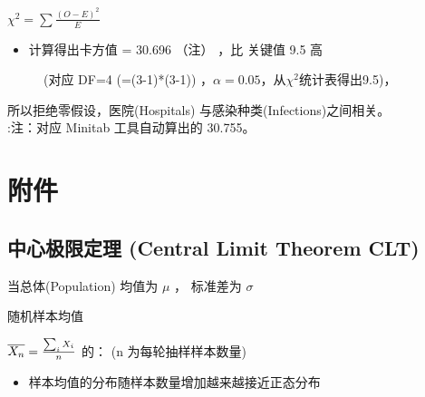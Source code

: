 \(\chi ^2 = \sum \frac{(O - E)^2} {E}\)

\begin{itemize}
\tightlist
\item
  计算得出卡方值 = 30.696 （注） ，比 关键值 9.5 高
\end{itemize}

\begin{description}
\item[]
(对应 DF=4 (=(3-1)*(3-1))
，\(\alpha = 0.05\)，从\(\chi ^2\)统计表得出9.5)，\\
\end{description}

所以拒绝零假设，医院(Hospitals) 与感染种类(Infections)之间相关。\\
:注：对应 Minitab 工具自动算出的 30.755。

\hypertarget{ux9644ux4ef6}{%
\section{附件}\label{ux9644ux4ef6}}

\hypertarget{ux4e2dux5fc3ux6781ux9650ux5b9aux7406-central-limit-theorem-clt}{%
\subsection{中心极限定理 (Central Limit Theorem
CLT)}\label{ux4e2dux5fc3ux6781ux9650ux5b9aux7406-central-limit-theorem-clt}}

当总体(Population) 均值为 \(\mu\) ， 标准差为 \(\sigma\)

\begin{description}
\tightlist
\item[]
随机样本均值
\end{description}

\(\overline{X_n} = {\sum_i X_i \over n}\) 的： (n 为每轮抽样样本数量)

\begin{description}
\item[]
\end{description}

\begin{itemize}
\tightlist
\item
  样本均值的分布随样本数量增加越来越接近正态分布
\end{itemize}

